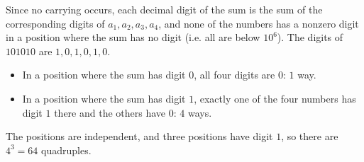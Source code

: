 Since no carrying occurs, each decimal digit of the sum is the sum of the corresponding digits of $a_1,a_2,a_3,a_4$, and none of the numbers has a nonzero digit in a position where the sum has no digit (i.e. all are below $10^6$). The digits of $101010$ are $1,0,1,0,1,0$.
\begin{itemize}
\item In a position where the sum has digit $0$, all four digits are $0$: $1$ way.
\item In a position where the sum has digit $1$, exactly one of the four numbers has digit $1$ there and the others have $0$: $4$ ways.
\end{itemize}
The positions are independent, and three positions have digit $1$, so there are $4^3=\boxed{64}$ quadruples.
